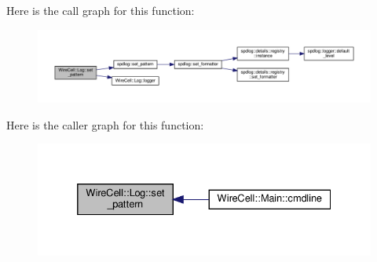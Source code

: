 Here is the call graph for this function\+:
\nopagebreak
\begin{figure}[H]
\begin{center}
\leavevmode
\includegraphics[width=350pt]{namespace_wire_cell_1_1_log_accaf0fe0149777811d7c5a648fe3f5e4_cgraph}
\end{center}
\end{figure}
Here is the caller graph for this function\+:
\nopagebreak
\begin{figure}[H]
\begin{center}
\leavevmode
\includegraphics[width=332pt]{namespace_wire_cell_1_1_log_accaf0fe0149777811d7c5a648fe3f5e4_icgraph}
\end{center}
\end{figure}
